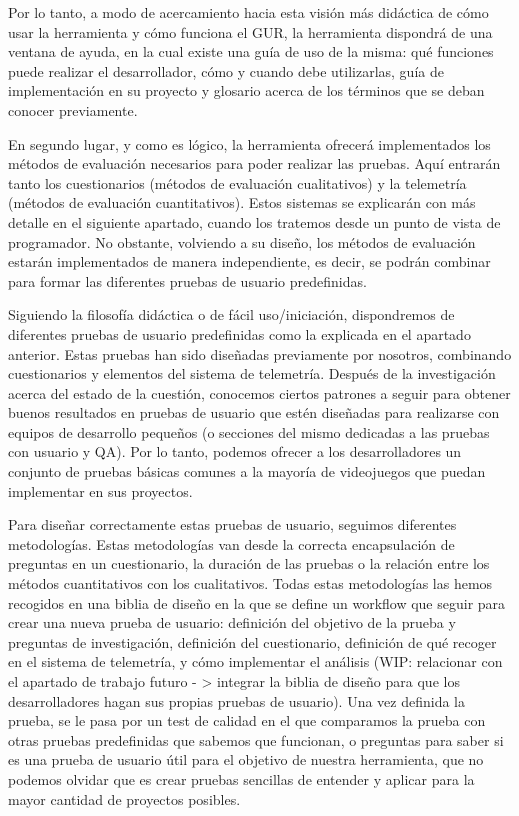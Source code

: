 Por lo tanto, a modo de acercamiento hacia esta visión más didáctica de cómo usar la herramienta y cómo funciona el GUR, la herramienta dispondrá de una ventana de ayuda, en la cual existe una guía de uso de la misma: qué funciones puede realizar el desarrollador, cómo y cuando debe utilizarlas, guía de implementación en su proyecto y glosario acerca de los términos que se deban conocer previamente.


En segundo lugar, y como es lógico, la herramienta ofrecerá implementados los métodos de evaluación necesarios para poder realizar las pruebas. Aquí entrarán tanto los cuestionarios (métodos de evaluación cualitativos) y la telemetría (métodos de evaluación cuantitativos). Estos sistemas se explicarán con más detalle en el siguiente apartado, cuando los tratemos desde un punto de vista de programador. No obstante, volviendo a su diseño, los métodos de evaluación estarán implementados de manera independiente, es decir, se podrán combinar para formar las diferentes pruebas de usuario predefinidas.


Siguiendo la filosofía didáctica o de fácil uso/iniciación, dispondremos de diferentes pruebas de usuario predefinidas como la explicada en el apartado anterior. Estas pruebas han sido diseñadas previamente por nosotros, combinando cuestionarios y elementos del sistema de telemetría. Después de la investigación acerca del estado de la cuestión, conocemos ciertos patrones a seguir para obtener buenos resultados en pruebas de usuario que estén diseñadas para realizarse con equipos de desarrollo pequeños (o secciones del mismo dedicadas a las pruebas con usuario y QA). Por lo tanto, podemos ofrecer a los desarrolladores un conjunto de pruebas básicas comunes a la mayoría de videojuegos que puedan implementar en sus proyectos. 


Para diseñar correctamente estas pruebas de usuario, seguimos diferentes metodologías. Estas metodologías van desde la correcta encapsulación de preguntas en un cuestionario, la duración de las pruebas o la relación entre los métodos cuantitativos con los cualitativos. Todas estas metodologías las hemos recogidos en una biblia de diseño en la que se define un workflow que seguir para crear una nueva prueba de usuario: definición del objetivo de la prueba y preguntas de investigación, definición del cuestionario, definición de qué recoger en el sistema de telemetría, y cómo implementar el análisis (WIP: relacionar con el apartado de trabajo futuro - > integrar la biblia de diseño para que los desarrolladores hagan sus propias pruebas de usuario). Una vez definida la prueba, se le pasa por un test de calidad en el que comparamos la prueba con otras pruebas predefinidas que sabemos que funcionan, o preguntas para saber si es una prueba de usuario útil para el objetivo de nuestra herramienta, que no podemos olvidar que es crear pruebas sencillas de entender y aplicar para la mayor cantidad de proyectos posibles.


